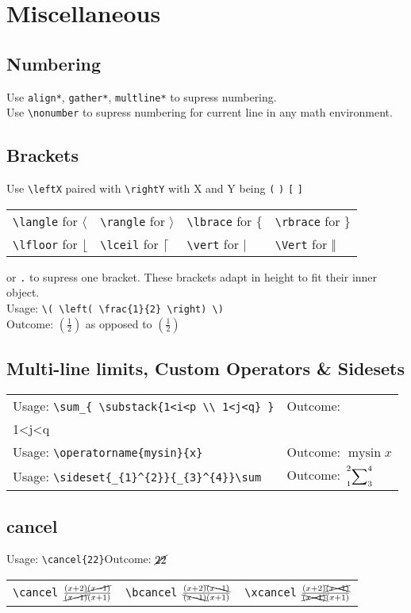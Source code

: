 \documentclass[draft]{cheatsht}
\begin{document}
\section{Miscellaneous}
\subsection{Numbering}    %
Use \verb!align*!, \verb!gather*!, \verb!multline*! to supress numbering.\\
Use \verb!\nonumber! to supress numbering for current line in
any math environment.

\subsection{Brackets}
Use \verb!\leftX! paired with \verb!\rightY! with X and Y being \verb!(!
\verb!)! \verb![! \verb!]!\\
\begin{tabular}{@{}llll@{}}
  \verb!\langle! for \(\langle\) & \verb!\rangle! for \(\rangle\) &
  \verb!\lbrace! for \(\lbrace\) & \verb!\rbrace! for  \(\rbrace\) \\
  \verb!\lfloor! for \(\lfloor\) & \verb!\lceil! for \(\lceil\) &
  \verb!\vert! for \(\vert\) & \verb!\Vert! for \(\Vert\)
\end{tabular}

or \verb!.! to supress one bracket. These brackets adapt in height to fit their
inner object.\\
Usage: \verb!\( \left( \frac{1}{2} \right) \)!\\
Outcome: \( \left( \frac{1}{2} \right) \) as opposed to \((\frac{1}{2})\)

\subsection{Multi-line limits, Custom Operators \& Sidesets}
\begin{tabular}{@{}ll@{}}
Usage: \verb!\sum_{ \substack{1<i<p \\ 1<j<q} }! &
  Outcome: \(\sum_{\substack{1<i<p\\1<j<q}}\) \\
Usage: \verb!\operatorname{mysin}{x}! & Outcome: \(\operatorname{mysin}{x}\)\\
Usage: \verb!\sideset{_{1}^{2}}{_{3}^{4}}\sum!&
  Outcome: \(\sideset{_{1}^{2}}{_{3}^{4}}\sum\)
\end{tabular}

\subsection{cancel}
Usage: \verb!\cancel{22}!\hspace{1.5cm}Outcome: \(\cancel{22}\)\vspace{4pt}\\
\begin{tabular}{@{}lll@{}}
  \verb!\cancel!  \(\frac{(x+2)\cancel{(x-1)}}{\cancel{(x-1)}(x+1)}\) &
  \verb!\bcancel! \(\frac{(x+2)\bcancel{(x-1)}}{\bcancel{(x-1)}(x+1)}\) &
  \verb!\xcancel! \(\frac{(x+2)\xcancel{(x-1)}}{\xcancel{(x-1)}(x+1)}\)
\end{tabular}
\end{document}
